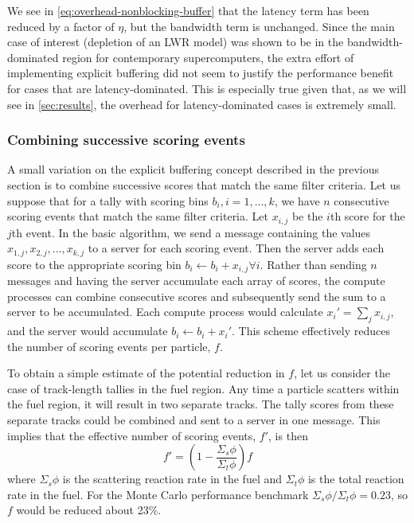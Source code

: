 \noindent We see in \eqref{eq:overhead-nonblocking-buffer} that the latency term
has been reduced by a factor of $\eta$, but the bandwidth term is
unchanged. Since the main case of interest (depletion of an LWR model) was shown
to be in the bandwidth-dominated region for contemporary supercomputers, the
extra effort of implementing explicit buffering did not seem to justify the
performance benefit for cases that are latency-dominated. This is especially
true given that, as we will see in \autoref{sec:results}, the overhead for
latency-dominated cases is extremely small.

\subsubsection{Combining successive scoring events}

A small variation on the explicit buffering concept described in the previous
section is to combine successive scores that match the same filter criteria. Let
us suppose that for a tally with scoring bins $b_i, i = 1, \dots, k$, we have
$n$ consecutive scoring events that match the same filter criteria. Let
$x_{i,j}$ be the $i$th score for the $j$th event. In the basic algorithm, we
send a message containing the values $x_{1,j}, x_{2,j}, \dots, x_{k,j}$ to a
server for each scoring event. Then the server adds each score to the
appropriate scoring bin $b_i \gets b_i + x_{i,j} \forall i$. Rather than sending
$n$ messages and having the server accumulate each array of scores, the compute
processes can combine consecutive scores and subsequently send the sum to a
server to be accumulated. Each compute process would calculate $x_i' = \sum_j
x_{i,j}$, and the server would accumulate $b_i \gets b_i + x_i'$. This scheme
effectively reduces the number of scoring events per particle, $f$.

To obtain a simple estimate of the potential reduction in $f$, let us consider
the case of track-length tallies in the fuel region. Any time a particle
scatters within the fuel region, it will result in two separate tracks. The
tally scores from these separate tracks could be combined and sent to a server
in one message. This implies that the effective number of scoring events, $f'$,
is then
\begin{equation}
  f' = \left ( 1 - \frac{\Sigma_s \phi}{\Sigma_t \phi} \right ) f
\end{equation}
where $\Sigma_s \phi$ is the scattering reaction rate in the fuel and $\Sigma_t
\phi$ is the total reaction rate in the fuel. For the Monte Carlo performance
benchmark $\Sigma_s \phi/\Sigma_t \phi = 0.23$, so $f$ would be reduced about
23\%.

